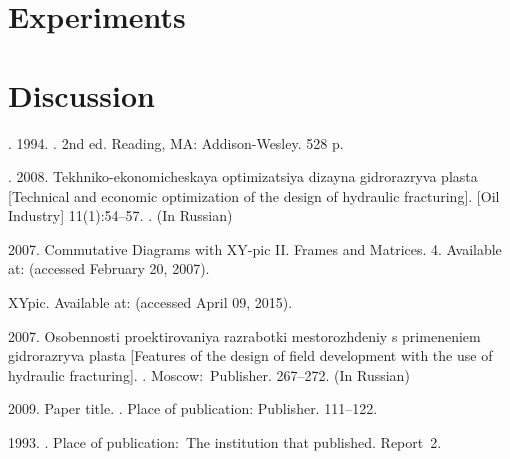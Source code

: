 \documentclass[12pt, twoside]{article}
\begin{document}
\section{Experiments}

\section{Discussion}

\begin{thebibliography}{99}

	. 1994.
	.
	2nd ed.
	Reading, MA: Addison-Wesley. 528 p.

	. 2008.
	Tekhniko-ekonomicheskaya optimizatsiya dizayna gidrorazryva plasta
	[Technical and economic optimization of the design of hydraulic fracturing].
	 [Oil Industry] 11(1):54--57.
	. (In Russian)

	 2007.
	Commutative Diagrams with XY-pic II. Frames and Matrices.
	  4.
	Available at: 
    (accessed February 20, 2007).

	XYpic.
	Available at: 
	(accessed April 09, 2015).

	 2007.
	Osobennosti proektirovaniya razrabotki mestorozhdeniy s primeneniem gidrorazryva plasta
	[Features of the design of field development with the use of hydraulic fracturing].
	.
	Moscow:~Publisher. 267--272. (In Russian)
	   	
     2009.
    Paper title.
    .
    Place of publication: Publisher. 111--122.
	
	 1993.
  	.
  	Place of publication:~The institution that published.  Report~2.
  	     	
\end{thebibliography}
\end{document}
